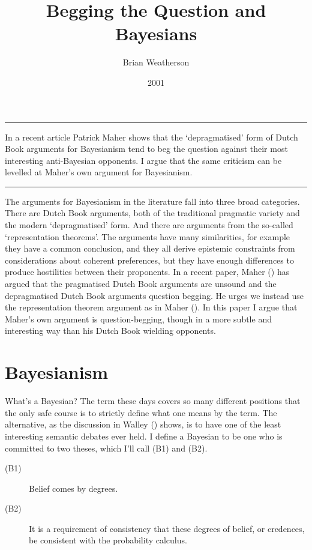 \documentclass[
  10pt,
  letterpaper,
  DIV=11,
  numbers=noendperiod,
  twoside]{scrartcl}
\title{Begging the Question and Bayesians}
\author{Brian Weatherson}
\date{2001}
\renewenvironment{abstract}
 {\vspace{-1.25cm}
 \quotation\small\noindent\rule{\linewidth}{.5pt}\par\smallskip
 \noindent }
 {\par\noindent\rule{\linewidth}{.5pt}\endquotation}
\begin{document}
\maketitle
\begin{abstract}
In a recent article Patrick Maher shows that the `depragmatised' form of
Dutch Book arguments for Bayesianism tend to beg the question against
their most interesting anti-Bayesian opponents. I argue that the same
criticism can be levelled at Maher's own argument for Bayesianism.
\end{abstract}


The arguments for Bayesianism in the literature fall into three broad
categories. There are Dutch Book arguments, both of the traditional
pragmatic variety and the modern `depragmatised' form. And there are
arguments from the so-called `representation theorems'. The arguments
have many similarities, for example they have a common conclusion, and
they all derive epistemic constraints from considerations about coherent
preferences, but they have enough differences to produce hostilities
between their proponents. In a recent paper, Maher
() has argued that the pragmatised Dutch
Book arguments are unsound and the depragmatised Dutch Book arguments
question begging. He urges we instead use the representation theorem
argument as in Maher (). In this paper I
argue that Maher's own argument is question-begging, though in a more
subtle and interesting way than his Dutch Book wielding opponents.

\section{Bayesianism}\label{bayesianism}

What's a Bayesian? The term these days covers so many different
positions that the only safe course is to strictly define what one means
by the term. The alternative, as the discussion in Walley
() shows, is to have one of the least
interesting semantic debates ever held. I define a Bayesian to be one
who is committed to two theses, which I'll call (B1) and (B2).

\begin{description}
\item[(B1)]
Belief comes by degrees.
\item[(B2)]
It is a requirement of consistency that these degrees of belief, or
credences, be consistent with the probability calculus.
\end{description}
\end{document}
